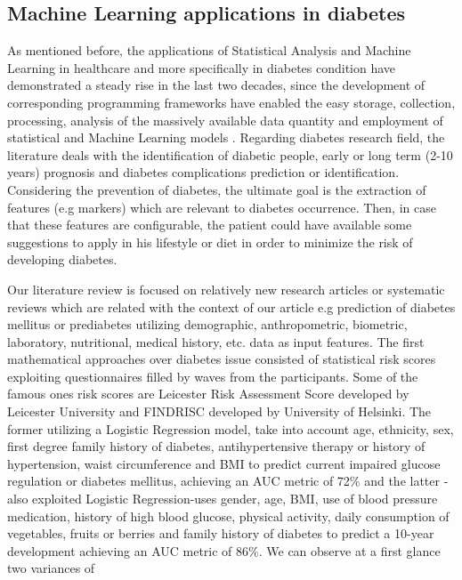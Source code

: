 \documentclass[journal,article,submit,pdftex,moreauthors]{Definitions/mdpi}
\begin{document}
\subsection{Machine Learning applications in diabetes}
As mentioned before, the applications of Statistical Analysis and 
Machine Learning in healthcare and more specifically in diabetes 
condition  have demonstrated a steady rise in the last two decades, 
since the development of corresponding programming frameworks have 
enabled the easy storage, collection, processing, analysis of the 
massively available data quantity and employment of statistical and
Machine Learning models \cite{frank2005weka, scikit-learn,  
seabold2010statsmodels}. Regarding diabetes research field, the 
literature deals with the  identification of diabetic people, early or
long term (2-10 years) prognosis and diabetes complications
prediction or identification. Considering the prevention of diabetes, the ultimate
goal is the extraction of features (e.g markers) which are relevant to diabetes
occurrence. Then, in case that  these features are configurable, the patient could 
have available some suggestions to apply in his lifestyle or diet in order to 
minimize the risk of developing diabetes.   
 \par Our literature review is focused on
relatively new research articles or systematic reviews which are 
related with the context of our article e.g prediction of diabetes
mellitus or prediabetes utilizing demographic, anthropometric,
biometric, laboratory, nutritional, medical history, etc. data as
input features. The first mathematical approaches  over diabetes 
issue consisted of statistical risk scores exploiting questionnaires
filled by waves from the participants. Some of the famous ones risk scores
are Leicester Risk Assessment Score\cite{gray} developed by Leicester 
University and FINDRISC \cite{lindstrom} developed by University of 
Helsinki. The former utilizing a Logistic Regression model, take into account 
age, ethnicity, sex, first degree family history of diabetes, antihypertensive 
therapy or history of hypertension, waist circumference and BMI to predict 
current impaired glucose regulation or diabetes mellitus, achieving an AUC 
metric of 72\% and the latter -also exploited Logistic Regression-uses gender, 
age, BMI, use of blood pressure medication, history of high blood glucose, 
physical activity, daily  consumption of vegetables, fruits or berries and 
family history of diabetes to predict a 10-year development achieving an AUC 
metric of 86\%. We can observe at a first glance two variances of 
\end{document}
